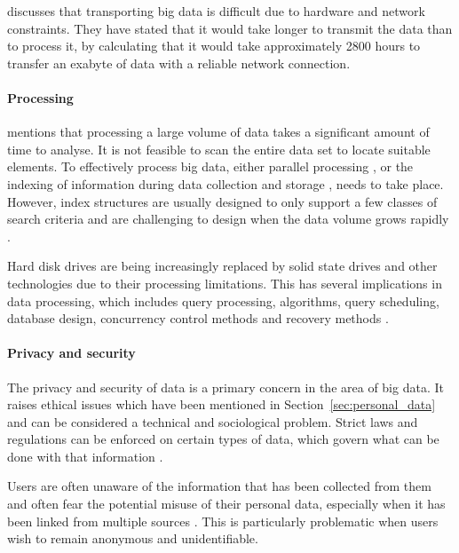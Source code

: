 \documentclass[a4paper]{article}
\begin{document}
{{{{					\citet{kaisler2013big} discusses that transporting big data is difficult due to hardware and network constraints. They have stated that it would take longer to transmit the data than to process it, by calculating that it would take approximately 2800 hours to transfer an exabyte of data with a reliable network connection.
				
				}

				\paragraph{Processing} { 
				
					\citet{labrinidis2012challenges} mentions that processing a large volume of data takes a significant amount of time to analyse. It is not feasible to scan the entire data set to locate suitable elements. To effectively process big data, either parallel processing \citep{kaisler2013big}, or the indexing of information during data collection and storage \citep{katal2013big} \citep{labrinidis2012challenges}, needs to take place. However, index structures are usually designed to only support a few classes of search criteria and are challenging to design when the data volume grows rapidly \citep{labrinidis2012challenges}.
					
					Hard disk drives are being increasingly replaced by solid state drives and other technologies due to their processing limitations. This has several implications in data processing, which includes query processing, algorithms, query scheduling, database design, concurrency control methods and recovery methods \citep{labrinidis2012challenges}.
					
				}
				
				\paragraph{Privacy and security} {
				
					The privacy and security of data is a primary concern in the area of big data. It raises ethical issues which have been mentioned in Section~\ref{sec:personal_data} and can be considered a technical and sociological problem. Strict laws and regulations can be enforced on certain types of data, which govern what can be done with that information \citep{labrinidis2012challenges}. 
					
					Users are often unaware of the information that has been collected from them \citep{katal2013big} and often fear the potential misuse of their personal data, especially when it has been linked from multiple sources \citep{labrinidis2012challenges}. This is particularly problematic when users wish to remain anonymous and unidentifiable.
					
}}}}
\end{document}
